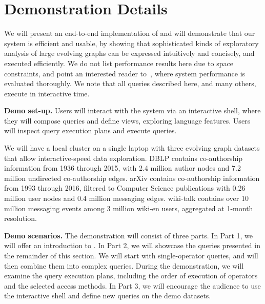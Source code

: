 \section{Demonstration Details}
\label{sec:cases}

We will present an end-to-end implementation of \sys and will
demonstrate that our system is efficient and usable, by showing that
sophisticated kinds of exploratory analysis of large evolving graphs
can be expressed intuitively and concisely, and executed efficiently.
We do not list performance results here due to space constraints, and
point an interested reader to~\cite{PortalarXiv2016}, where system
performance is evaluated thoroughly.  We note that all queries
described here, and many others, execute in interactive time.

{\bf Demo set-up.} Users will interact with the \sys system via an
interactive shell, where they will compose queries and define \tg
views, exploring language features.  Users will inspect query
execution plans and execute queries.

We will have a local cluster on a single laptop with three evolving
graph datasets that allow interactive-speed data exploration. DBLP
contains co-authorship information from 1936 through 2015, with 2.4
million author nodes and 7.2 million undirected co-authorship edges.
arXiv contains co-authorship information from 1993 through 2016,
filtered to Computer Science publications with 0.26 million user nodes
and 0.4 million messaging edges.  wiki-talk contains over 10 million
messaging events among 3 million wiki-en users,
aggregated at 1-month resolution.

{\bf Demo scenarios.} The demonstration will consist of three parts.
In Part 1, we will offer an introduction to \ql.  In Part 2, we will
showcase the queries presented in the remainder of this section. We will start with single-operator
queries, and will then combine them into complex queries.  During the
demonstration, we will examine the query execution plans, including
the order of execution of \tga operators and the selected access
methods.  In Part 3, we will encourage the audience to use the
interactive shell and define new queries on the demo datasets.

